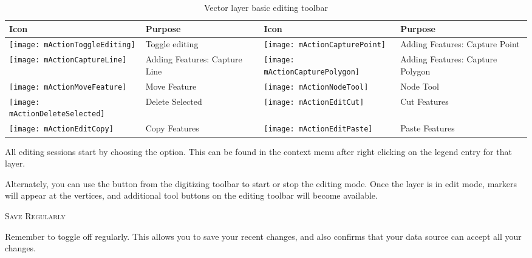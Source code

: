 \begin{table}[h]
\centering
\caption{Vector layer basic editing toolbar}\label{tab:vector_editing}\medskip
\small
\begin{tabular}{|l|p{6.9cm}|l|p{6.9cm}|}
\hline \textbf{Icon} & \textbf{Purpose} & \textbf{Icon} & \textbf{Purpose} \\
\hline \texttt{[image: mActionToggleEditing]}
   & Toggle editing
   & \texttt{[image: mActionCapturePoint]}
   & Adding Features: Capture Point \\
\hline \texttt{[image: mActionCaptureLine]}
   & Adding Features: Capture Line
   & \texttt{[image: mActionCapturePolygon]}
   & Adding Features: Capture Polygon \\
\hline \texttt{[image: mActionMoveFeature]}
   & Move Feature
   & \texttt{[image: mActionNodeTool]}
   & Node Tool \\ 
\hline \texttt{[image: mActionDeleteSelected]}
   & Delete Selected
   & \texttt{[image: mActionEditCut]}
   & Cut Features \\
\hline \texttt{[image: mActionEditCopy]}
   & Copy Features
   & \texttt{[image: mActionEditPaste]} 
   & Paste Features \\
\hline
\end{tabular}
\end{table}

All editing sessions start by choosing the
 option.
This can be found in the context menu after right clicking on the legend
entry for that layer.

Alternately, you can use the 
 button from the digitizing
toolbar to start or stop the editing mode. Once the
layer is in edit mode, markers will appear at the vertices, and additional
tool buttons on the editing toolbar will become available.

\begin{Tip}\caption{\textsc{Save Regularly}}
Remember to toggle 
off regularly. This allows you to save your recent changes, and also confirms
that your data source can accept all your changes.
\end{Tip}


